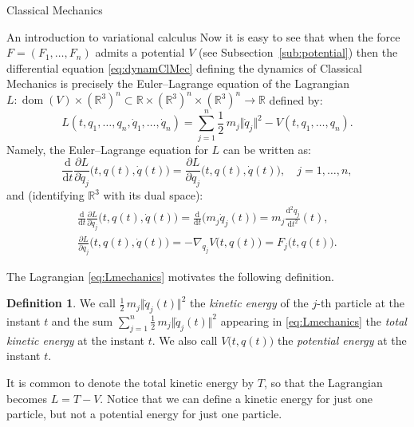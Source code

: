 \documentclass[oneside,a4paper,11pt]{amsbook}
\newcommand{\R}{\mathds R}
\newcommand{\dd}{\mathrm d}
\DeclareMathOperator{\Dom}{dom}
\theoremstyle{remark}\newtheorem{exercise}{Exercise}[chapter]
\theoremstyle{plain}\newtheorem{teo}{Theorem}[section]
\theoremstyle{plain}\newtheorem{lem}[teo]{Lemma}
\theoremstyle{plain}\newtheorem{prop}[teo]{Proposition}
\theoremstyle{plain}\newtheorem{cor}[teo]{Corollary}
\theoremstyle{definition}\newtheorem{defin}[teo]{Definition}
\theoremstyle{remark}\newtheorem{rem}[teo]{Remark}
\theoremstyle{definition}\newtheorem{notation}[teo]{Notation}
\theoremstyle{definition}\newtheorem{convention}[teo]{Convention}
\theoremstyle{definition}\newtheorem{example}[teo]{Example}
\numberwithin{section}{chapter}
\numberwithin{equation}{section}
\begin{document}
\begin{chapter}{Classical Mechanics}
\begin{section}{An introduction to variational calculus}
Now it is easy to see that when the force $F=(F_1,\ldots,F_n)$ admits a potential $V$
(see Subsection~\ref{sub:potential}) then the differential equation \eqref{eq:dynamClMec} defining the dynamics of
Classical Mechanics is precisely the Euler--Lagrange equation of the Lagrangian
$L:\Dom(V)\times(\R^3)^n\subset\R\times(\R^3)^n\times(\R^3)^n\to\R$ defined by:
\begin{equation}\label{eq:Lmechanics}
L(t,q_1,\ldots,q_n,\dot q_1,\ldots,\dot q_n)=\sum_{j=1}^n\frac12\,m_j\Vert\dot q_j\Vert^2-V(t,q_1,\ldots,q_n).
\end{equation}
Namely, the Euler--Lagrange equation for $L$ can be written as:
\[\frac{\dd}{\dd t}\frac{\partial L}{\partial\dot q_j}\big(t,q(t),\dot q(t)\big)=
\frac{\partial L}{\partial q_j}\big(t,q(t),\dot q(t)\big),\quad j=1,\ldots,n,\]
and (identifying $\R^3$ with its dual space):
\begin{gather*}
\frac{\dd}{\dd t}\frac{\partial L}{\partial\dot q_j}\big(t,q(t),\dot q(t)\big)=\frac{\dd}{\dd t}\big(m_j\dot q_j(t)\big)
=m_j\frac{\dd^2q_j}{\dd t^2}(t),\\
\frac{\partial L}{\partial q_j}\big(t,q(t),\dot q(t)\big)=-\nabla_{q_j}V\big(t,q(t)\big)=F_j\big(t,q(t)\big).
\end{gather*}

The Lagrangian \eqref{eq:Lmechanics} motivates the following definition.
\begin{defin}\label{thm:defenergies}
We call $\frac12\,m_j\Vert\dot q_j(t)\Vert^2$ the {\em kinetic energy\/} of the $j$-th particle at the instant $t$
and the sum $\sum_{j=1}^n\frac12\,m_j\Vert\dot q_j(t)\Vert^2$ appearing in \eqref{eq:Lmechanics} the {\em total kinetic
energy\/} at the instant $t$. We also call $V\big(t,q(t)\big)$ the {\em potential energy\/} at the instant $t$.
\end{defin}
It is common to denote the total kinetic energy by $T$, so that the Lagrangian becomes $L=T-V$.
Notice that we can define a kinetic energy for just one particle, but not a potential energy for just one particle.


\end{section}
\end{chapter}
\end{document}
